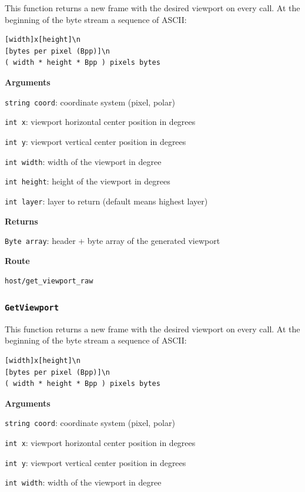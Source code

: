 \documentclass{article}
\begin{document}
This function returns a new frame with the desired viewport on every call.
At the beginning of the byte stream a sequence of ASCII:
\begin{verbatim}
[width]x[height]\n
[bytes per pixel (Bpp)]\n
( width * height * Bpp ) pixels bytes
\end{verbatim}

\textbf{Arguments}

\texttt{string coord}: coordinate system (pixel, polar)

\texttt{int x}: viewport horizontal center position in degrees

\texttt{int y}: viewport vertical center position in degrees

\texttt{int width}: width of the viewport in degree

\texttt{int height}: height of the viewport in degrees

\texttt{int layer}: layer to return (default means highest layer)

\textbf{Returns}

\texttt{Byte array}: header + byte array of the generated viewport

\textbf{Route}

\texttt{host/get_viewport_raw}


\subsubsection*{\texttt{GetViewport}}

This function returns a new frame with the desired viewport on every call.
At the beginning of the byte stream a sequence of ASCII:
\begin{verbatim}
[width]x[height]\n
[bytes per pixel (Bpp)]\n
( width * height * Bpp ) pixels bytes
\end{verbatim}

\textbf{Arguments}

\texttt{string coord}: coordinate system (pixel, polar)

\texttt{int x}: viewport horizontal center position in degrees

\texttt{int y}: viewport vertical center position in degrees

\texttt{int width}: width of the viewport in degree
\end{document}
